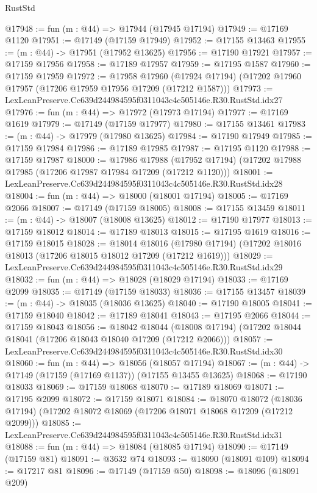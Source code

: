 \begin{lexlean}{RustStd}
\begin{coremodule}
@17948 := fun (m : @44) => @17944 (@17945 @17194)
@17949 := @17169 @1120
@17951 := @17149 (@17159 @17949)
@17952 := @17155 @13463
@17955 := (m : @44) -> @17951 (@17952 @13625)
@17956 := @17190 @17921
@17957 := @17159 @17956
@17958 := @17189 @17957
@17959 := @17195 @1587
@17960 := @17159 @17959
@17972 := @17958
    @17960
    (@17924 @17194)
    (@17202 @17960 @17957 (@17206 @17959 @17956 @17209 (@17212 @1587)))
@17973 := LexLeanPreserve.Cc639d244984595f0311043c4c505146e.R30.RustStd.idx27
@17976 := fun (m : @44) => @17972 (@17973 @17194)
@17977 := @17169 @1619
@17979 := @17149 (@17159 @17977)
@17980 := @17155 @13461
@17983 := (m : @44) -> @17979 (@17980 @13625)
@17984 := @17190 @17949
@17985 := @17159 @17984
@17986 := @17189 @17985
@17987 := @17195 @1120
@17988 := @17159 @17987
@18000 := @17986
    @17988
    (@17952 @17194)
    (@17202 @17988 @17985 (@17206 @17987 @17984 @17209 (@17212 @1120)))
@18001 := LexLeanPreserve.Cc639d244984595f0311043c4c505146e.R30.RustStd.idx28
@18004 := fun (m : @44) => @18000 (@18001 @17194)
@18005 := @17169 @2066
@18007 := @17149 (@17159 @18005)
@18008 := @17155 @13459
@18011 := (m : @44) -> @18007 (@18008 @13625)
@18012 := @17190 @17977
@18013 := @17159 @18012
@18014 := @17189 @18013
@18015 := @17195 @1619
@18016 := @17159 @18015
@18028 := @18014
    @18016
    (@17980 @17194)
    (@17202 @18016 @18013 (@17206 @18015 @18012 @17209 (@17212 @1619)))
@18029 := LexLeanPreserve.Cc639d244984595f0311043c4c505146e.R30.RustStd.idx29
@18032 := fun (m : @44) => @18028 (@18029 @17194)
@18033 := @17169 @2099
@18035 := @17149 (@17159 @18033)
@18036 := @17155 @13457
@18039 := (m : @44) -> @18035 (@18036 @13625)
@18040 := @17190 @18005
@18041 := @17159 @18040
@18042 := @17189 @18041
@18043 := @17195 @2066
@18044 := @17159 @18043
@18056 := @18042
    @18044
    (@18008 @17194)
    (@17202 @18044 @18041 (@17206 @18043 @18040 @17209 (@17212 @2066)))
@18057 := LexLeanPreserve.Cc639d244984595f0311043c4c505146e.R30.RustStd.idx30
@18060 := fun (m : @44) => @18056 (@18057 @17194)
@18067 := (m : @44) -> @17149 (@17159 (@17169 @1137)) (@17155 @13455 @13625)
@18068 := @17190 @18033
@18069 := @17159 @18068
@18070 := @17189 @18069
@18071 := @17195 @2099
@18072 := @17159 @18071
@18084 := @18070
    @18072
    (@18036 @17194)
    (@17202 @18072 @18069 (@17206 @18071 @18068 @17209 (@17212 @2099)))
@18085 := LexLeanPreserve.Cc639d244984595f0311043c4c505146e.R30.RustStd.idx31
@18088 := fun (m : @44) => @18084 (@18085 @17194)
@18090 := @17149 (@17159 @81)
@18091 := @3632 @74
@18093 := @18090 (@18091 @109)
@18094 := @17217 @81
@18096 := @17149 (@17159 @50)
@18098 := @18096 (@18091 @209)

\end{coremodule}
\end{lexlean}
